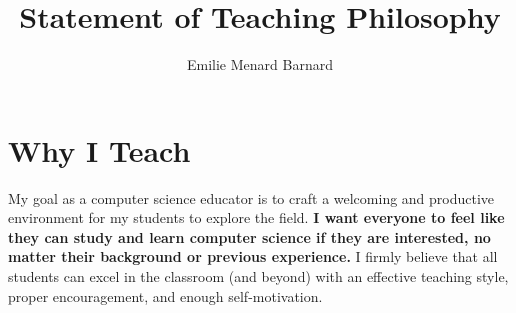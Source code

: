 \documentclass[12pt]{amsart} \usepackage{amssymb}
\title[]{Statement of Teaching Philosophy}
\author[]{Emilie Menard Barnard}
\begin{document}
\maketitle
\thispagestyle{empty}


\section*{Why I Teach}
\noindent My goal as a computer science educator is to craft a welcoming and productive environment for my students to explore the field. \textbf{I want everyone to feel like they can study and learn computer science if they are interested, no matter their background or previous experience.} I firmly believe that all students can excel in the classroom (and beyond) with an effective teaching style, proper encouragement, and enough self-motivation.
\end{document}
